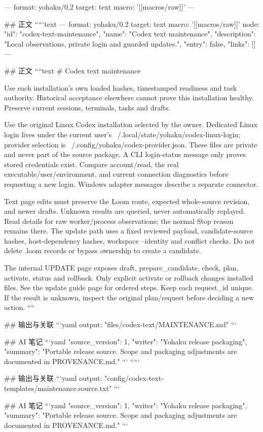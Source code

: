 ---
format: yohaku/0.2
target: text
macro: '[[macros/raw]]'
---

## 正文
`````text
---
format: yohaku/0.2
target: text
macro: '[[macros/raw]]'
node: {"id": "codex-text-maintenance", "name": "Codex text maintenance", "description": "Local observations, private login and guarded updates.", "entry": false, "links": []}
---

## 正文
````text
# Codex text maintenance

Use each installation's own loaded hashes, timestamped readiness and task authority. Historical acceptance elsewhere cannot prove this installation healthy. Preserve current sessions, terminals, tasks and drafts.

Use the original Linux Codex installation selected by the owner. Dedicated Linux login lives under the current user's ~/.local/state/yohaku/codex-linux-login; provider selection is ~/.config/yohaku/codex-provider.json. These files are private and never part of the source package. A CLI login-status message only proves stored credentials exist. Compare account/read, the real executable/user/environment, and current connection diagnostics before requesting a new login. Windows adapter messages describe a separate connector.

Text page edits must preserve the Loom route, expected whole-source revision, and newer drafts. Unknown results are queried, never automatically replayed. Read details for raw worker/process observations; the normal Stop reason remains there. The update path uses a fixed reviewed payload, candidate-source hashes, host-dependency hashes, workspace --identity and conflict checks. Do not delete .loom records or bypass ownership to create a candidate.

The internal UPDATE page exposes draft, prepare_candidate, check, plan, activate, status and rollback. Only explicit activate or rollback changes installed files. See the update guide page for ordered steps. Keep each request_id unique. If the result is unknown, inspect the original plan/request before deciding a new action.
````

## 输出与关联
```yaml
output: "files/codex-text/MAINTENANCE.md"
```

## AI 笔记
```yaml
{"source_version": 1, "writer": "Yohaku release packaging", "summary": "Portable release source. Scope and packaging adjustments are documented in PROVENANCE.md."}
```
`````

## 输出与关联
```yaml
output: "config/codex-text-templates/maintenance.source.txt"
```

## AI 笔记
```yaml
{"source_version": 1, "writer": "Yohaku release packaging", "summary": "Portable release source. Scope and packaging adjustments are documented in PROVENANCE.md."}
```
